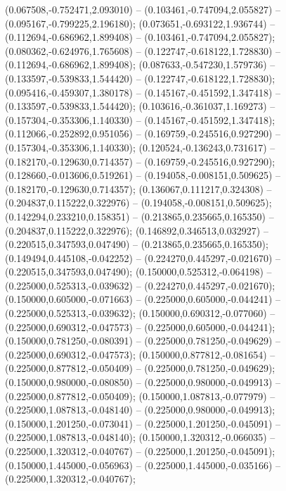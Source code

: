  (0.067508,-0.752471,2.093010) -- (0.103461,-0.747094,2.055827) -- (0.095167,-0.799225,2.196180);
 (0.073651,-0.693122,1.936744) -- (0.112694,-0.686962,1.899408) -- (0.103461,-0.747094,2.055827);
 (0.080362,-0.624976,1.765608) -- (0.122747,-0.618122,1.728830) -- (0.112694,-0.686962,1.899408);
 (0.087633,-0.547230,1.579736) -- (0.133597,-0.539833,1.544420) -- (0.122747,-0.618122,1.728830);
 (0.095416,-0.459307,1.380178) -- (0.145167,-0.451592,1.347418) -- (0.133597,-0.539833,1.544420);
 (0.103616,-0.361037,1.169273) -- (0.157304,-0.353306,1.140330) -- (0.145167,-0.451592,1.347418);
 (0.112066,-0.252892,0.951056) -- (0.169759,-0.245516,0.927290) -- (0.157304,-0.353306,1.140330);
 (0.120524,-0.136243,0.731617) -- (0.182170,-0.129630,0.714357) -- (0.169759,-0.245516,0.927290);
 (0.128660,-0.013606,0.519261) -- (0.194058,-0.008151,0.509625) -- (0.182170,-0.129630,0.714357);
 (0.136067,0.111217,0.324308) -- (0.204837,0.115222,0.322976) -- (0.194058,-0.008151,0.509625);
 (0.142294,0.233210,0.158351) -- (0.213865,0.235665,0.165350) -- (0.204837,0.115222,0.322976);
 (0.146892,0.346513,0.032927) -- (0.220515,0.347593,0.047490) -- (0.213865,0.235665,0.165350);
 (0.149494,0.445108,-0.042252) -- (0.224270,0.445297,-0.021670) -- (0.220515,0.347593,0.047490);
 (0.150000,0.525312,-0.064198) -- (0.225000,0.525313,-0.039632) -- (0.224270,0.445297,-0.021670);
 (0.150000,0.605000,-0.071663) -- (0.225000,0.605000,-0.044241) -- (0.225000,0.525313,-0.039632);
 (0.150000,0.690312,-0.077060) -- (0.225000,0.690312,-0.047573) -- (0.225000,0.605000,-0.044241);
 (0.150000,0.781250,-0.080391) -- (0.225000,0.781250,-0.049629) -- (0.225000,0.690312,-0.047573);
 (0.150000,0.877812,-0.081654) -- (0.225000,0.877812,-0.050409) -- (0.225000,0.781250,-0.049629);
 (0.150000,0.980000,-0.080850) -- (0.225000,0.980000,-0.049913) -- (0.225000,0.877812,-0.050409);
 (0.150000,1.087813,-0.077979) -- (0.225000,1.087813,-0.048140) -- (0.225000,0.980000,-0.049913);
 (0.150000,1.201250,-0.073041) -- (0.225000,1.201250,-0.045091) -- (0.225000,1.087813,-0.048140);
 (0.150000,1.320312,-0.066035) -- (0.225000,1.320312,-0.040767) -- (0.225000,1.201250,-0.045091);
 (0.150000,1.445000,-0.056963) -- (0.225000,1.445000,-0.035166) -- (0.225000,1.320312,-0.040767);
